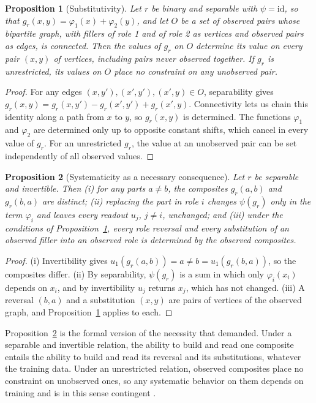 \documentclass{article}
\theoremstyle{definition}
\theoremstyle{plain}
\newtheorem{proposition}{Proposition}
\theoremstyle{remark}
\begin{document}
\begin{proposition}[Substitutivity]
\label{prop:separable}
Let $r$ be binary and separable with $\psi = \mathrm{id}$, so that $g_r(x, y) = \varphi_1(x) + \varphi_2(y)$, and let $O$ be a set of observed pairs whose bipartite graph, with fillers of role 1 and of role 2 as vertices and observed pairs as edges, is connected. Then the values of $g_r$ on $O$ determine its value on every pair $(x, y)$ of vertices, including pairs never observed together. If $g_r$ is unrestricted, its values on $O$ place no constraint on any unobserved pair.
\end{proposition}

\begin{proof}
For any edges $(x, y'), (x', y'), (x', y) \in O$, separability gives $g_r(x, y) = g_r(x, y') - g_r(x', y') + g_r(x', y)$. Connectivity lets us chain this identity along a path from $x$ to $y$, so $g_r(x, y)$ is determined. The functions $\varphi_1$ and $\varphi_2$ are determined only up to opposite constant shifts, which cancel in every value of $g_r$. For an unrestricted $g_r$, the value at an unobserved pair can be set independently of all observed values.
\end{proof}

\begin{proposition}[Systematicity as a necessary consequence]
\label{prop:systematic}
Let $r$ be separable and invertible. Then (i) for any parts $a \neq b$, the composites $g_r(a, b)$ and $g_r(b, a)$ are distinct; (ii) replacing the part in role $i$ changes $\psi(g_r)$ only in the term $\varphi_i$ and leaves every readout $u_j$, $j \neq i$, unchanged; and (iii) under the conditions of Proposition~\ref{prop:separable}, every role reversal and every substitution of an observed filler into an observed role is determined by the observed composites.
\end{proposition}

\begin{proof}
(i) Invertibility gives $u_1(g_r(a, b)) = a \neq b = u_1(g_r(b, a))$, so the composites differ. (ii) By separability, $\psi(g_r)$ is a sum in which only $\varphi_i(x_i)$ depends on $x_i$, and by invertibility $u_j$ returns $x_j$, which has not changed. (iii) A reversal $(b, a)$ and a substitution $(x, y)$ are pairs of vertices of the observed graph, and Proposition~\ref{prop:separable} applies to each.
\end{proof}

\noindent
Proposition~\ref{prop:systematic} is the formal version of the
necessity that \citet{fodor1990} demanded. Under a separable and
invertible relation, the ability to build and read one composite
entails the ability to build and read its reversal and its
substitutions, whatever the training data. Under an unrestricted
relation, observed composites place no constraint on unobserved ones,
so any systematic behavior on them depends on training and is in this
sense contingent \citep{aizawa2003}.
\end{document}
